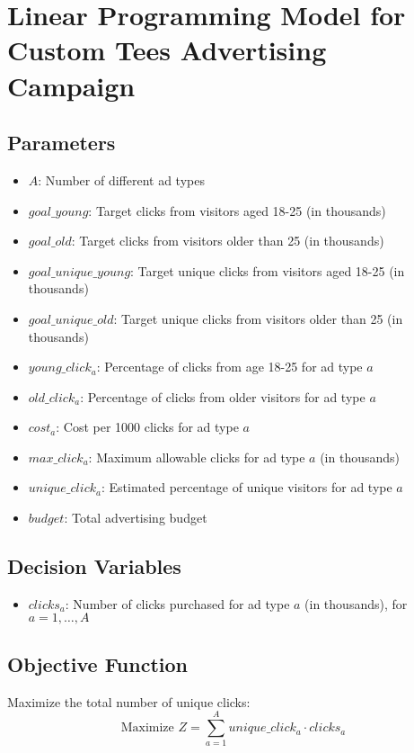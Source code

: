 \documentclass{article}
\begin{document}
\section*{Linear Programming Model for Custom Tees Advertising Campaign}

\subsection*{Parameters}
\begin{itemize}
    \item $A$: Number of different ad types
    \item $goal\_young$: Target clicks from visitors aged 18-25 (in thousands)
    \item $goal\_old$: Target clicks from visitors older than 25 (in thousands)
    \item $goal\_unique\_young$: Target unique clicks from visitors aged 18-25 (in thousands)
    \item $goal\_unique\_old$: Target unique clicks from visitors older than 25 (in thousands)
    \item $young\_click_{a}$: Percentage of clicks from age 18-25 for ad type $a$
    \item $old\_click_{a}$: Percentage of clicks from older visitors for ad type $a$
    \item $cost_{a}$: Cost per 1000 clicks for ad type $a$
    \item $max\_click_{a}$: Maximum allowable clicks for ad type $a$ (in thousands)
    \item $unique\_click_{a}$: Estimated percentage of unique visitors for ad type $a$
    \item $budget$: Total advertising budget
\end{itemize}

\subsection*{Decision Variables}
\begin{itemize}
    \item $clicks_{a}$: Number of clicks purchased for ad type $a$ (in thousands), for $a = 1, \ldots, A$
\end{itemize}

\subsection*{Objective Function}
Maximize the total number of unique clicks:
\[
\text{Maximize } Z = \sum_{a=1}^{A} unique\_click_{a} \cdot clicks_{a}
\]
\end{document}
